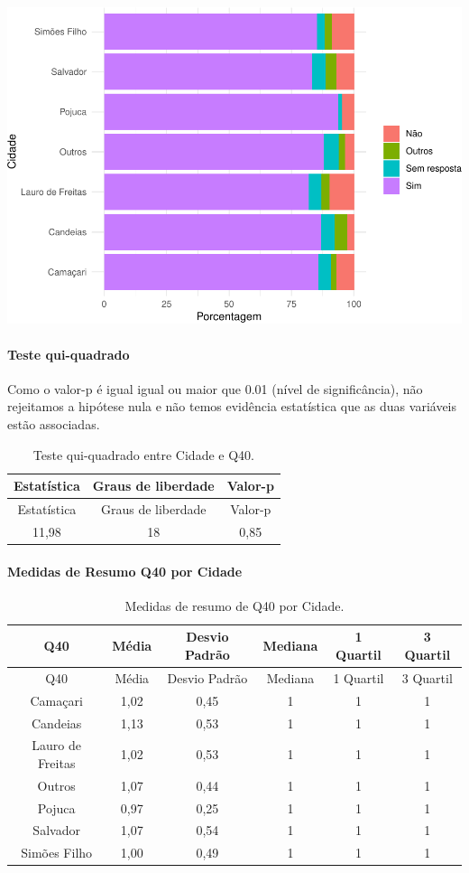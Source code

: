 \documentclass[]{article}
\let\oldparagraph\paragraph
\renewcommand{\paragraph}[1]{\oldparagraph{#1}\mbox{}}
\begin{document}
\begin{center}\includegraphics[width=0.75\linewidth]{relatorio_covid19_files/figure-latex/unnamed-chunk-1547-1} \end{center}

\hypertarget{teste-qui-quadrado-132}{%
\paragraph{Teste qui-quadrado}\label{teste-qui-quadrado-132}}

Como o valor-p é igual igual ou maior que 0.01 (nível de significância), não rejeitamos a hipótese nula e não temos evidência estatística que as duas variáveis estão associadas.

\begin{longtable}[]{@{}ccc@{}}
\caption{\label{tab:unnamed-chunk-1549}Teste qui-quadrado entre Cidade e Q40.}\tabularnewline
\toprule
Estatística & Graus de liberdade & Valor-p\tabularnewline
\midrule
\endfirsthead
\toprule
Estatística & Graus de liberdade & Valor-p\tabularnewline
\midrule
\endhead
11,98 & 18 & 0,85\tabularnewline
\bottomrule
\end{longtable}

\cleardoublepage

\hypertarget{medidas-de-resumo-q40-por-cidade}{%
\paragraph{Medidas de Resumo Q40 por Cidade}\label{medidas-de-resumo-q40-por-cidade}}

\begin{longtable}[]{@{}cccccc@{}}
\caption{\label{tab:unnamed-chunk-1550}Medidas de resumo de Q40 por Cidade.}\tabularnewline
\toprule
Q40 & Média & Desvio Padrão & Mediana & 1 Quartil & 3 Quartil\tabularnewline
\midrule
\endfirsthead
\toprule
Q40 & Média & Desvio Padrão & Mediana & 1 Quartil & 3 Quartil\tabularnewline
\midrule
\endhead
Camaçari & 1,02 & 0,45 & 1 & 1 & 1\tabularnewline
Candeias & 1,13 & 0,53 & 1 & 1 & 1\tabularnewline
Lauro de Freitas & 1,02 & 0,53 & 1 & 1 & 1\tabularnewline
Outros & 1,07 & 0,44 & 1 & 1 & 1\tabularnewline
Pojuca & 0,97 & 0,25 & 1 & 1 & 1\tabularnewline
Salvador & 1,07 & 0,54 & 1 & 1 & 1\tabularnewline
Simões Filho & 1,00 & 0,49 & 1 & 1 & 1\tabularnewline
\bottomrule
\end{longtable}
\end{document}
